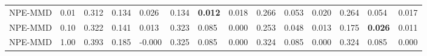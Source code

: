 \begin{tabular}{ ll |lll|lll|lll|lll }
NPE-MMD & 0.01 & \cellcolor{lime!57} 0.312 & \cellcolor{lime!48} 0.134 & \cellcolor{LightSkyBlue1!89} 0.026 & \cellcolor{lime!88} 0.134 & \cellcolor{lime!100} \textbf{0.012} & \cellcolor{LightSkyBlue1!80} 0.018 & \cellcolor{lime!40} 0.266 & \cellcolor{lime!56} 0.053 & \cellcolor{LightSkyBlue1!94} 0.020 & \cellcolor{lime!40} 0.264 & \cellcolor{lime!57} 0.054 & \cellcolor{LightSkyBlue1!96} 0.017 \\
NPE-MMD & 0.10 & \cellcolor{lime!50} 0.322 & \cellcolor{lime!42} 0.141 & \cellcolor{LightSkyBlue1!94} 0.013 & \cellcolor{lime!0} 0.323 & \cellcolor{lime!0} 0.085 & \cellcolor{LightSkyBlue1!99} 0.000 & \cellcolor{lime!48} 0.253 & \cellcolor{lime!65} 0.048 & \cellcolor{LightSkyBlue1!96} 0.013 & \cellcolor{lime!98} 0.175 & \cellcolor{lime!100} \textbf{0.026} & \cellcolor{LightSkyBlue1!97} 0.011 \\
NPE-MMD & 1.00 & \cellcolor{lime!0} 0.393 & \cellcolor{lime!0} 0.185 & \cellcolor{LightSkyBlue1!100} -0.000 & \cellcolor{lime!0} 0.325 & \cellcolor{lime!0} 0.085 & \cellcolor{LightSkyBlue1!100} 0.000 & \cellcolor{lime!1} 0.324 & \cellcolor{lime!6} 0.085 & \cellcolor{LightSkyBlue1!100} 0.000 & \cellcolor{lime!1} 0.324 & \cellcolor{lime!8} 0.085 & \cellcolor{LightSkyBlue1!100} 0.000 \vspace{0.1cm}\\

     \hline
\end{tabular}